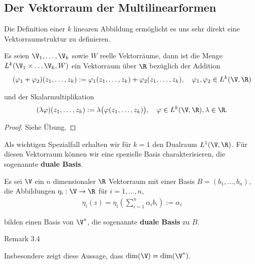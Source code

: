 \subsection{Der Vektorraum der Multilinearformen}
\label{\detokenize{vektoranalysis/multilinear:der-vektorraum-der-multilinearformen}}
\par
Die Definition einer \(k\) linearen Abbildung ermöglicht es uns sehr direkt eine Vektorraumstruktur zu definieren.
\label{vektoranalysis/multilinear:lemma-8}
\begin{lemma}{}{}



\par
Es seien \(\V_1,\ldots,\V_k\) sowie \(W\) reelle Vektorräume, dann ist die Menge \(L^k(\V_1\times\ldots\V_k,W)\) ein Vektorraum über \(\R\) bezüglich der Addition
\begin{align*}
(\varphi_1+\varphi_2)(z_1,\ldots,z_k) := \varphi_1(z_1,\ldots,z_k) +
\varphi_2(z_1,\ldots,z_k),\quad \varphi_1,\varphi_2\in L^k(\V,\R)
\end{align*}
\par
und der Skalarmultiplikation
\begin{align*}
(\lambda\varphi)(z_1,\ldots,z_k) := \lambda\big(\varphi(z_1,\ldots,z_k)\big),\quad\varphi\in L^k(\V,\R), \lambda\in\R.
\end{align*}\end{lemma}

\begin{proof}
 Siehe Übung.
\end{proof}

\par
Als wichtigen Spezialfall erhalten wir für \(k=1\) den Dualraum \(L^1(\V,\R)\). Für diesen Vektorraum können wir eine spezielle Basis charakterisieren, die sogenannte \textbf{duale Basis}.
\label{vektoranalysis/multilinear:lemma-9}
\begin{lemma}{}{}



\par
Es sei \(\V\) ein \(n\) dimensionaler \(\R\) Vektorraum mit einer Basis \(B = (b_1,\ldots,b_n)\), die Abbildungen
\(\eta_i:\V\rightarrow\R\) für \(i=1,\ldots,n\),
\begin{align*}
\eta_i(z) = \eta_i\left(\sum_{i=1}^n \alpha_i b_i\right) := \alpha_i
\end{align*}
\par
bilden einen Basis von \(\V^\ast\), die sogenannte \textbf{duale Basis} zu \(B\).
\end{lemma}
\label{vektoranalysis/multilinear:remark-10}
\begin{emphBox}{}{}{Remark 3.4}



\par
Insbesondere zeigt diese Aussage, dass \(\dim(\V) = \dim(\V^\ast)\).
\end{emphBox}

